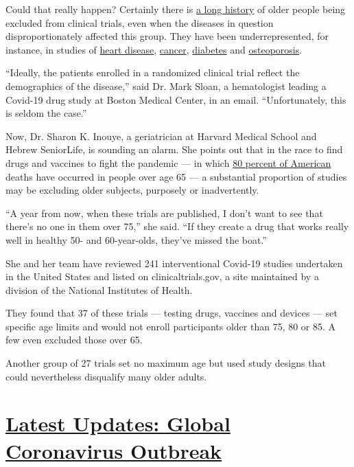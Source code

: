 Could that really happen? Certainly there is
\href{https://onlinelibrary.wiley.com/doi/abs/10.1111/j.1532-5415.2010.03032.x}{a
long history} of older people being excluded from clinical trials, even
when the diseases in question disproportionately affected this group.
They have been underrepresented, for instance, in studies of
\href{https://onlinelibrary.wiley.com/doi/10.1111/jgs.14833}{heart
disease},
\href{https://ascopubs.org/doi/abs/10.1200/JCO.2003.08.010}{cancer},
\href{https://onlinelibrary.wiley.com/doi/abs/10.1111/jgs.12215}{diabetes}
and
\href{https://onlinelibrary.wiley.com/doi/abs/10.1111/jgs.14840}{osteoporosis}.

``Ideally, the patients enrolled in a randomized clinical trial reflect
the demographics of the disease,'' said Dr. Mark Sloan, a hematologist
leading a Covid-19 drug study at Boston Medical Center, in an email.
``Unfortunately, this is seldom the case.''

Now, Dr. Sharon K. Inouye, a geriatrician at Harvard Medical School and
Hebrew SeniorLife, is sounding an alarm. She points out that in the race
to find drugs and vaccines to fight the pandemic --- in which
\href{https://www.cdc.gov/nchs/nvss/vsrr/covid_weekly/index.htm\#AgeAndSex}{80
percent of American} deaths have occurred in people over age 65 --- a
substantial proportion of studies may be excluding older subjects,
purposely or inadvertently.

``A year from now, when these trials are published, I don't want to see
that there's no one in them over 75,'' she said. ``If they create a drug
that works really well in healthy 50- and 60-year-olds, they've missed
the boat.''

She and her team have reviewed 241 interventional Covid-19 studies
undertaken in the United States and listed on clinicaltrials.gov, a site
maintained by a division of the National Institutes of Health.

They found that 37 of these trials --- testing drugs, vaccines and
devices --- set specific age limits and would not enroll participants
older than 75, 80 or 85. A few even excluded those over 65.

Another group of 27 trials set no maximum age but used study designs
that could nevertheless disqualify many older adults.

\hypertarget{latest-updates-global-coronavirus-outbreak}{%
\section{\texorpdfstring{\href{https://www.nytimes3xbfgragh.onion/2020/08/01/world/coronavirus-covid-19.html?action=click\&pgtype=Article\&state=default\&region=MAIN_CONTENT_1\&context=storylines_live_updates}{Latest
Updates: Global Coronavirus
Outbreak}}{Latest Updates: Global Coronavirus Outbreak}}\label{latest-updates-global-coronavirus-outbreak}}

